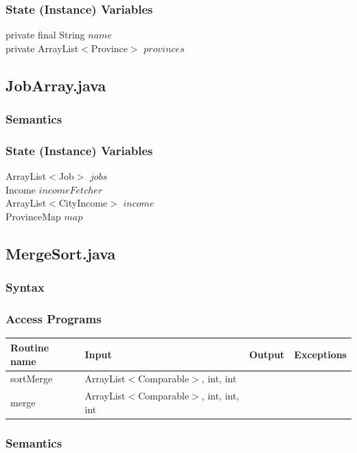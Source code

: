 \documentclass[12pt,fleqn]{article}
\begin{document}
\subsubsection*{State (Instance) Variables}
	private final String $name$\\
	private ArrayList$<$Province$>$ $provinces$\\


\subsection*{JobArray.java}\label{pjobarray}

\subsubsection*{Semantics}
\subsubsection*{State (Instance) Variables}
    	ArrayList$<$Job$>$ $jobs$\\
	Income $incomeFetcher$\\
	ArrayList$<$CityIncome$>$ $income$\\
	ProvinceMap $map$\\


\subsection*{MergeSort.java}\label{psort}
\subsubsection* {Syntax}

\subsubsection* {Access Programs}
\begin{tabular}{| l | l | l | l |}
\hline
\textbf{Routine name} & \textbf{Input} & \textbf{Output} & \textbf{Exceptions}\\
\hline
sortMerge & ArrayList$<$Comparable$>$, int, int & ~ & ~\\
\hline
merge & ArrayList$<$Comparable$>$, int, int, int & ~ & ~\\
\hline
\end{tabular}

\subsubsection*{Semantics}
\end{document}
